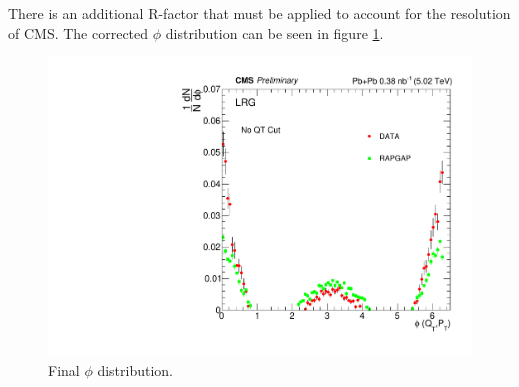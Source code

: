 There is an additional R-factor that must be applied to account for the resolution of CMS. The corrected $\phi$ distribution can be seen in figure \ref{fig:finPhi}. 

\begin{figure}[h!]
\begin{centering}
\includegraphics[width=6in]{Chapter6/importfigs/phi_allQt_final.pdf}
\par\end{centering}
\caption{Final $\phi$ distribution. \label{fig:finPhi}}
\end{figure}